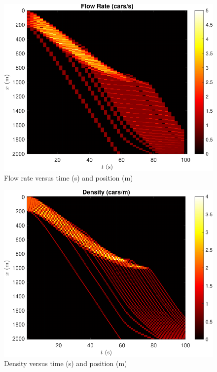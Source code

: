 \documentclass[12pt]{article}
\begin{document}
    \begin{figure}[H]
      \begin{center}
        \includegraphics[width=13cm]{mlbn_flow.pdf}
        \caption{Flow rate versus time (s) and position (m)}
        \label{fig:multi lane flow}
      \end{center}
    \end{figure}

    \begin{figure}[H]
      \begin{center}
        \includegraphics[width=13cm]{mlbn_density.pdf}
        \caption{Density versus time (s) and position (m)}
        \label{fig:multi lane density}
      \end{center}
    \end{figure}
\end{document}
